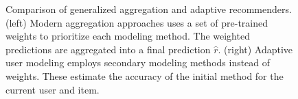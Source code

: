 \begin{figure}[t]
\begin{minipage}{0.49\textwidth}
  \end{minipage} 
  \vspace{2em}
  \caption[Comparison of Aggregation and Adaption]{
    Comparison of generalized aggregation and adaptive recommenders.
    (left) Modern aggregation approaches uses a set of pre-trained weights
    to prioritize each modeling method.
    The weighted predictions are aggregated into a final prediction $\hat{r}$.
    (right) Adaptive user modeling employs secondary modeling methods instead
    of weights. These estimate the accuracy of the initial method
    for the current user and item.
  }
  \label{fig:layer:comparison}
\end{figure}


